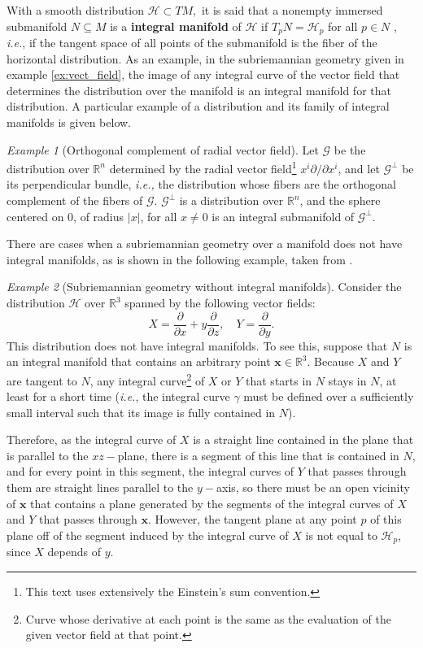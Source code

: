 \documentclass[12pt, letterpaper, reqno]{amsart}
\theoremstyle{definition}
\theoremstyle{plain}
\theoremstyle{remark}
\newtheorem{ex}{Example}
\begin{document}
With a smooth distribution $ \mathcal{H} \subset TM, $ it is said that a nonempty immersed submanifold $ N\subseteq M $  is a \textbf{integral manifold} of $\mathcal{H}$ if $ T_p N = \mathcal{H}_p $ for all $ p\in N $ , \textit{i.e.}, if the tangent space of all points of the submanifold is the fiber of the horizontal distribution. As an example, in the subriemannian geometry given in example \ref{ex:vect_field}, the image of any integral curve of the vector field that determines the distribution over the manifold is an integral manifold for that distribution. A particular example of a distribution and its family of integral manifolds is given below.

\begin{ex}[Orthogonal complement of radial vector field]
	Let $ \mathcal{G} $ be the distribution over $ \mathbb{R}^n $ determined by the radial vector field\footnote{This text uses extensively the Einstein's sum convention.} $ x^i \partial / \partial x^i $, and let $ \mathcal{G}^\perp $ be its perpendicular bundle, \textit{i.e.,} the distribution whose fibers are the orthogonal complement of the fibers of $ \mathcal{G}. $ $ \mathcal{G}^\perp $ is a distribution over $ \mathbb{R}^n  $, and the sphere centered on $0$, of radius $ |x| $, for all $ x\neq0 $ is an integral submanifold of $ \mathcal{G}^\perp. $        
\end{ex}

There are cases when a subriemannian geometry over a manifold does not have integral manifolds, as is shown in the following example, taken from \cite{lee2003introduction}.

\begin{ex}[Subriemannian geometry without integral manifolds] 
	Consider the distribution $ \mathcal{H} $ over $ \mathbb{R}^3 $ spanned by the following vector fields: 
	$$ X = \frac{\partial}{\partial x} + y \frac{\partial}{\partial z}, \quad Y = \frac{\partial}{\partial y}.  $$ 
	This distribution does not have integral manifolds. To see this, suppose that $ N $ is an integral manifold that contains an arbitrary point $ \textbf{x} \in \mathbb{R}^3.  $ Because $ X $ and $ Y $ are tangent to $ N $, any integral curve\footnote{Curve whose derivative at each point is the same as the evaluation of the given vector field at that point.} of $ X $ or $ Y $ that starts in $ N $ stays in $ N $, at least for a short time (\textit{i.e.}, the integral curve $ \gamma $ must be defined over a sufficiently small interval such that its image is fully contained in $ N $).   

	Therefore, as the integral curve of $ X $ is a straight line contained in the plane that is parallel to the $ xz- $plane, there is a segment of this line that is contained in $ N $, and for every point in this segment, the integral curves of $ Y $ that passes through them are straight lines parallel to the $ y- $axis, so there must be an open vicinity of $ \textbf{x}  $ that contains a plane generated by the segments of the integral curves of $ X $ and $ Y $ that passes through $ \textbf{x}.  $ However, the tangent plane at any point $ p $  of this plane  off of the segment induced by the integral curve of $ X $ is not equal to $ \mathcal{H}_p, $ since $ X $ depends of $ y $.   
\end{ex}
\end{document}
